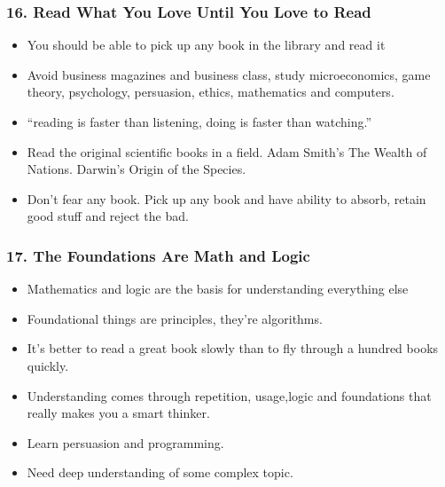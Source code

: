 \begin{frame}[fragile]
\frametitle{16. Read What You Love Until You Love to Read}
\begin{itemize}
\item You should be able to pick up any book in the library and read it
\item Avoid business magazines and business class, study microeconomics, game theory, psychology, persuasion, ethics, mathematics and computers.
\item ``reading is faster than listening, doing is faster than watching.''
\item Read the original scientific books in a field. Adam Smith's The Wealth of Nations. Darwin's Origin of the Species.
\item Don't fear any book. Pick up any book and have ability to absorb, retain good stuff and reject the bad.
\end{itemize}
\end{frame}

\begin{frame}[fragile]
\frametitle{17. The Foundations Are Math and Logic}
\begin{itemize}
\item Mathematics and logic are the basis for understanding everything else
\item Foundational things are principles, they're algorithms.
\item It's better to read a great book slowly than to fly through a hundred books quickly.
\item Understanding comes through repetition, usage,logic and foundations that really makes you a smart thinker.
\item Learn persuasion and programming.
\item Need deep understanding of some complex topic.
\end{itemize}
\end{frame}

